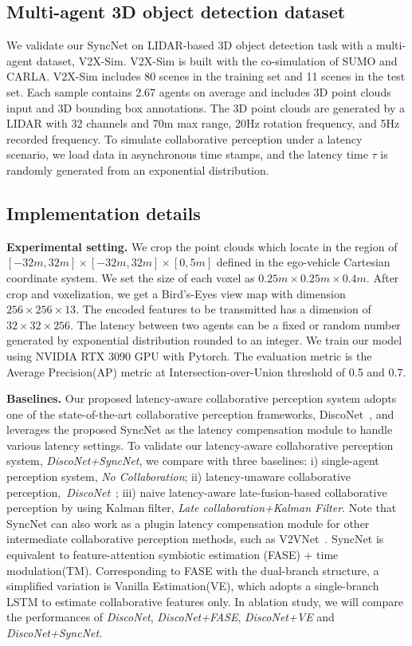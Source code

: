 \documentclass[runningheads]{llncs}
\begin{document}
\subsection{Multi-agent 3D object detection dataset}
We validate our SyncNet on LIDAR-based 3D object detection task\cite{pointcloud,pcsurvey} with a multi-agent dataset, V2X-Sim\cite{v2xsim}. V2X-Sim is built with the co-simulation of SUMO\cite{sumo} and CARLA\cite{carla}. V2X-Sim includes 80 scenes in the training set and 11 scenes in the test set. Each sample contains 2.67 agents on average and includes 3D point clouds input and 3D bounding box annotations. The 3D point clouds are generated by a LIDAR with 32 channels and 70m max range, 20Hz rotation frequency, and 5Hz recorded frequency. To simulate collaborative perception under a latency scenario, we load data in asynchronous time stamps, and the latency time $\tau$ is randomly generated from an exponential distribution.

\subsection{Implementation details}
\textbf{Experimental setting.} We crop the point clouds which locate in the region of $[-32m,32m]\times[-32m,32m]\times[0,5m]$ defined in the ego-vehicle Cartesian coordinate system. We set the size of each voxel as $0.25m\times0.25m\times0.4m$. After crop and voxelization, we get a Bird's-Eyes view map with dimension $256\times256\times13$. The encoded features to be transmitted has a dimension of $32\times32\times256$. The latency between two agents can be a fixed or random number generated by exponential distribution rounded to an integer. We train our model using NVIDIA RTX 3090 GPU with Pytorch. The evaluation metric is the Average Precision(AP) metric at Intersection-over-Union threshold of 0.5 and 0.7.

\textbf{Baselines.} 
Our proposed latency-aware collaborative perception system adopts one of the state-of-the-art collaborative perception frameworks, DiscoNet~\cite{disconet}, and leverages the proposed SyncNet as the latency compensation module to handle various latency settings. To validate our latency-aware collaborative perception system, \textit{DiscoNet+SyncNet}, we compare with three baselines: i) single-agent perception system, \textit{No Collaboration}; ii) latency-unaware collaborative perception,~\textit{DiscoNet}~\cite{disconet}; iii) naive latency-aware late-fusion-based collaborative perception by using Kalman filter\cite{kalman}, \textit{Late collaboration+Kalman Filter}. Note that SyncNet can also work as a plugin latency compensation module for other intermediate collaborative perception methods, such as V2VNet~\cite{v2vnet}. SyncNet is equivalent to feature-attention symbiotic estimation (FASE) + time modulation(TM). Corresponding to FASE with the dual-branch structure, a simplified variation is Vanilla Estimation(VE), which adopts a single-branch LSTM to estimate collaborative features only. In ablation study, we will compare the performances of \textit{DiscoNet}, \textit{DiscoNet+FASE}, \textit{DiscoNet+VE} and \textit{DiscoNet+SyncNet}.
\end{document}
